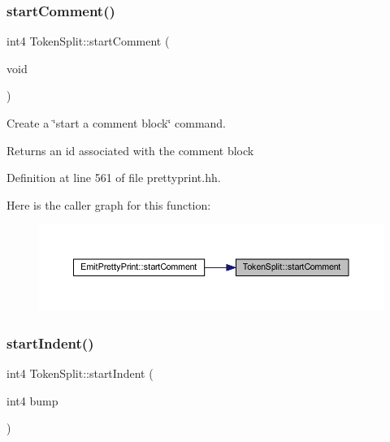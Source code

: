 \subsubsection{\texorpdfstring{startComment()}{startComment()}}
{\footnotesize\ttfamily int4 Token\+Split\+::start\+Comment (\begin{DoxyParamCaption}\item[{void}]{ }\end{DoxyParamCaption})\hspace{0.3cm}{\ttfamily [inline]}}



Create a \char`\"{}start a comment block\char`\"{} command. 

\begin{DoxyReturn}{Returns}
an id associated with the comment block 
\end{DoxyReturn}


Definition at line 561 of file prettyprint.\+hh.

Here is the caller graph for this function\+:
\nopagebreak
\begin{figure}[H]
\begin{center}
\leavevmode
\includegraphics[width=350pt]{class_token_split_a64074d483f92a724cf846c4893b1c1c7_icgraph}
\end{center}
\end{figure}
\mbox{\label{class_token_split_abc86a21025a728d2dbe050fe22b9570b}} 
\subsubsection{\texorpdfstring{startIndent()}{startIndent()}}
{\footnotesize\ttfamily int4 Token\+Split\+::start\+Indent (\begin{DoxyParamCaption}\item[{int4}]{bump }\end{DoxyParamCaption})\hspace{0.3cm}{\ttfamily [inline]}}



